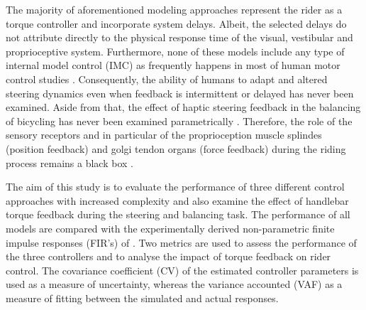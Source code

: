 The majority of aforementioned modeling approaches represent the rider as a torque controller and incorporate system delays. Albeit, the selected delays do not attribute directly to the physical response time of the visual, vestibular and proprioceptive system. Furthermore, none of these models include any type of internal model control (IMC) as frequently happens in most of human motor control studies \cite{francis1976internal, garcia1982internal, wolpert1995internal, gillespie2016human}. Consequently, the ability of humans to adapt and altered steering dynamics even when feedback is intermittent or delayed has never been examined.  Aside from that, the effect of haptic steering feedback in the balancing of bicycling has never been examined parametrically . Therefore, the role of the sensory receptors and in particular of the proprioception muscle splindes (position feedback) and golgi tendon organs (force feedback) during the riding process remains a black box .

The aim of this study is to evaluate the performance of three different control approaches with increased complexity and also examine the effect of  handlebar torque feedback during the steering and balancing task. The performance of all models are compared with the experimentally derived non-parametric finite impulse responses (FIR's) of  \citet{dialynaseffect}. Two metrics are used to assess the performance of the three controllers and to analyse the impact of torque feedback on rider control. The covariance coefficient (CV) of the estimated controller parameters is used as a measure of uncertainty, whereas the variance accounted (VAF) as a measure of fitting between the simulated and actual responses.


